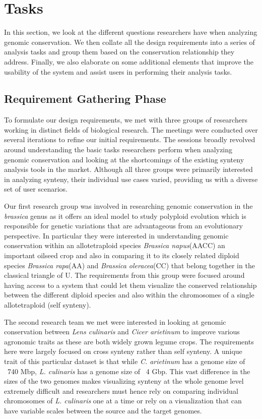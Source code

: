 \section{Tasks}

In this section, we look at the different questions researchers have when analyzing genomic conservation. We then collate all the design requirements into a series of analysis tasks and group them based on the conservation relationship they address. Finally, we also elaborate on some additional elements that improve the usability of the system and assist users in performing their analysis tasks.

\subsection{Requirement Gathering Phase}
To formulate our design requirements, we met with three groups of researchers working in distinct fields of biological research. The meetings were conducted over several iterations to refine our initial requirements. The sessions broadly revolved around understanding the basic tasks researchers perform when analyzing genomic conservation and looking at the shortcomings of the existing synteny analysis tools in the market. Although all three groups were primarily interested in analyzing synteny, their individual use cases varied, providing us with a diverse set of user scenarios.

Our first research group was involved in researching genomic conservation in the \textit{brassica} genus as it offers an ideal model to study polyploid evolution which is responsible for genetic variations that are advantageous from an evolutionary perspective\cite{madlung2013polyploidy,liu2014brassica}. In particular they were interested in understanding genomic conservation within an allotetraploid species \textit{Brassica napus}(AACC) an important oilseed crop and also in comparing it to its closely related diploid species \textit{Brassica rapa}(AA) and \textit{Brassica oleracea}(CC) that belong together in the classical triangle of U\cite{nagaharu1935genome}. The requirements from this group were focused around having access to a system that could let them visualize the conserved relationship between the different diploid species and also within the chromosomes of a single allotetraploid (self synteny). 

The second research team we met were interested in looking at genomic conservation between \textit{Lens culinaris} and \textit{Cicer arietinum} to improve various agronomic traits as these are both widely grown legume crops. The requirements here were largely focused on cross synteny rather than self synteny. A unique trait of this particular dataset is that while \textit{C. arietinum} has a genome size of ~740 Mbp, \textit{L. culinaris} has a genome size of ~4 Gbp. This vast difference in the sizes of the two genomes makes visualizing synteny at the whole genome level extremely difficult and researchers must hence rely on comparing individual chromosomes of \textit{L. culinaris} one at a time or rely on a visualization that can have variable scales between the source and the target genomes.


